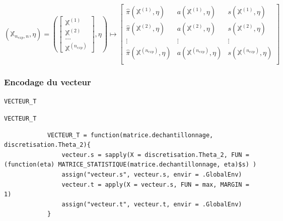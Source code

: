 \documentclass{article}
\newenvironment{fonction}[1][htb]
  {\renewcommand{\algorithmcfname}{Fonction}%
   \begin{algorithm}[#1]%
  }{\end{algorithm}}
\begin{document}
 
     $$
     (\mathbb{X}_{n_{exp},n}, \eta) =                         
     (\begin{bmatrix}
         \mathbb{X}^{(1)} \\
         \mathbb{X}^{(2)} \\
         \ldots \\
         \mathbb{X}^{(n_{exp})}
     \end{bmatrix},\eta) 
     \longmapsto 
     \begin{bmatrix}
         \hat\pi(\mathbb{X}^{(1)},\eta) & a(\mathbb{X}^{(1)},\eta) & s(\mathbb{X}^{(1)},\eta) \\
         \hat\pi(\mathbb{X}^{(2)},\eta) & a(\mathbb{X}^{(2)},\eta) & s(\mathbb{X}^{(2)},\eta) \\
         \vdots & \vdots & \vdots \\
         \hat\pi(\mathbb{X}^{(n_{exp})},\eta) & a(\mathbb{X}^{(n_{exp})},\eta) & s(\mathbb{X}^{(n_{exp})},\eta) \\
     \end{bmatrix}
     $$

    \newpage
    \subsubsection{Encodage du vecteur}

    \begin{fonction}[h]
        \caption{\texttt{VECTEUR\_T}}
    \end{fonction}
    \begin{script}[h]
        \caption{\texttt{VECTEUR\_T}}
        \begin{verbatim}
            VECTEUR_T = function(matrice.dechantillonnage, discretisation.Theta_2){
                vecteur.s = sapply(X = discretisation.Theta_2, FUN = (function(eta) MATRICE_STATISTIQUE(matrice.dechantillonnage, eta)$s) )
                assign("vecteur.s", vecteur.s, envir = .GlobalEnv)
                vecteur.t = apply(X = vecteur.s, FUN = max, MARGIN = 1)
                assign("vecteur.t", vecteur.t, envir = .GlobalEnv)
            }
        \end{verbatim}
    \end{script}
\end{document}
